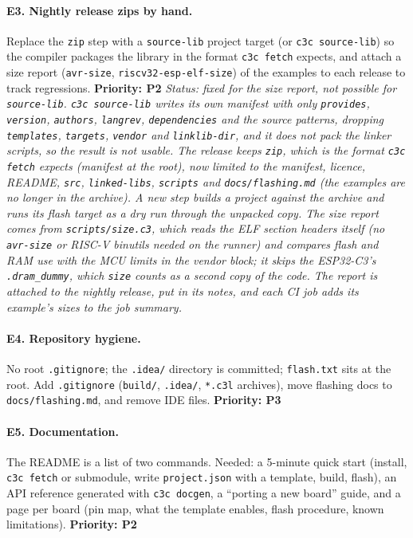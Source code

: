 \documentclass[11pt,a4paper]{article}
\newcommand{\pkg}[1]{\texttt{#1}}
\newcommand{\prio}[1]{\textbf{Priority: #1}}
\begin{document}
\paragraph{E3. Nightly release zips by hand.}
Replace the \pkg{zip} step with a \pkg{source-lib} project target (or \pkg{c3c source-lib}) so the
compiler packages the library in the format \pkg{c3c fetch} expects, and attach a size report
(\pkg{avr-size}, \pkg{riscv32-esp-elf-size}) of the examples to each release to track regressions.
\prio{P2}
\textit{Status: fixed for the size report, not possible for \pkg{source-lib}. \pkg{c3c source-lib} writes its own manifest with only \pkg{provides}, \pkg{version}, \pkg{authors}, \pkg{langrev}, \pkg{dependencies} and the source patterns, dropping \pkg{templates}, \pkg{targets}, \pkg{vendor} and \pkg{linklib-dir}, and it does not pack the linker scripts, so the result is not usable. The release keeps \pkg{zip}, which is the format \pkg{c3c fetch} expects (manifest at the root), now limited to the manifest, licence, README, \pkg{src}, \pkg{linked-libs}, \pkg{scripts} and \pkg{docs/flashing.md} (the examples are no longer in the archive). A new step builds a project against the archive and runs its flash target as a dry run through the unpacked copy. The size report comes from \pkg{scripts/size.c3}, which reads the ELF section headers itself (no \pkg{avr-size} or RISC-V binutils needed on the runner) and compares flash and RAM use with the MCU limits in the vendor block; it skips the ESP32-C3's \pkg{.dram\_dummy}, which \pkg{size} counts as a second copy of the code. The report is attached to the nightly release, put in its notes, and each CI job adds its example's sizes to the job summary.}

\paragraph{E4. Repository hygiene.}
No root \pkg{.gitignore}; the \pkg{.idea/} directory is committed; \pkg{flash.txt} sits at the root.
Add \pkg{.gitignore} (\pkg{build/}, \pkg{.idea/}, \pkg{*.c3l} archives), move flashing docs to
\pkg{docs/flashing.md}, and remove IDE files. \prio{P3}

\paragraph{E5. Documentation.}
The README is a list of two commands. Needed: a 5-minute quick start (install, \pkg{c3c fetch} or
submodule, write \pkg{project.json} with a template, build, flash), an API reference generated
with \pkg{c3c docgen}, a ``porting a new board'' guide, and a page per board (pin map, what the
template enables, flash procedure, known limitations). \prio{P2}
\end{document}
